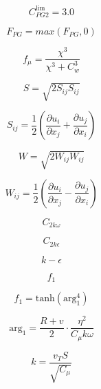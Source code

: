 \begin{equation}
C_{PG2}^{\lim }=3.0
\end{equation}

\begin{equation}
F_{PG}=max(F_{PG}, 0)
\end{equation}

\begin{equation}
f_{\mu }=\frac{\chi ^{3}}{\chi ^{3}+C_{w}^{3}}
\end{equation}

\begin{equation}
S=\sqrt{2S_{ij}S_{ij}}
\end{equation}

\begin{equation}
S_{ij}=\frac{1}{2}(\frac{\partial 
u_{i}}{\partial x_{j}}+\frac{\partial u_{j}}{\partial x_{i}})
\end{equation}

\begin{equation}
W=\sqrt{2W_{ij}W_{ij}}
\end{equation}

\begin{equation}
W_{ij}=\frac{1}{2}(\frac{\partial 
u_{i}}{\partial x_{j}}-\frac{\partial u_{j}}{\partial x_{i}})
\end{equation}

\begin{equation}
C_{2k\omega}
\end{equation}

\begin{equation}
C_{2k\epsilon}
\end{equation}

\begin{equation}
k-\epsilon
\end{equation}

\begin{equation}
f_1
\end{equation}

\begin{equation}
f_{1}=\text{tanh}(\text{arg}_{1}^{4})
\end{equation}

\begin{equation}
\text{arg}_{1}=\frac{R+v}{2}\cdot\frac{\eta ^{2}}{C_{\mu }k\omega }
\end{equation}

\begin{equation}
k=\frac{v_{T}S}{\sqrt{C_{\mu }}}
\end{equation}

